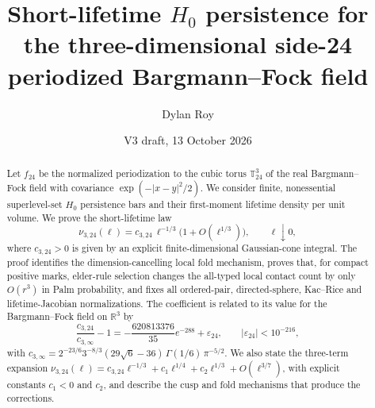 \documentclass[11pt,reqno]{amsart}
\theoremstyle{definition}
\theoremstyle{remark}
\newcommand{\T}{\mathbb T}
\newcommand{\R}{\mathbb R}
\begin{document}
\title[Short-lifetime $H_0$ persistence on the side-24 torus]{Short-lifetime $H_0$ persistence for the three-dimensional side-24 periodized Bargmann--Fock field}
\author{Dylan Roy}
\date{V3 draft, 13 October 2026}

\begin{abstract}
Let $f_{24}$ be the normalized periodization to the cubic torus $\T_{24}^3$ of the real Bargmann--Fock field with covariance $\exp(-|x-y|^2/2)$. We consider finite, nonessential superlevel-set $H_0$ persistence bars and their first-moment lifetime density per unit volume. We prove the short-lifetime law
\[
\nu_{3,24}(\ell)=c_{3,24}\,\ell^{-1/3}\bigl(1+O(\ell^{1/3})\bigr),\qquad \ell\downarrow0,
\]
where $c_{3,24}>0$ is given by an explicit finite-dimensional Gaussian-cone integral. The proof identifies the dimension-cancelling local fold mechanism, proves that, for compact positive marks, elder-rule selection changes the all-typed local contact count by only $O(r^3)$ in Palm probability, and fixes all ordered-pair, directed-sphere, Kac--Rice and lifetime-Jacobian normalizations. The coefficient is related to its value for the Bargmann--Fock field on $\R^3$ by
\[
\frac{c_{3,24}}{c_{3,\infty}}-1=-\frac{620813376}{35}e^{-288}+\varepsilon_{24},\qquad |\varepsilon_{24}|<10^{-216},
\]
with $c_{3,\infty}=2^{-23/6}3^{-8/3}(29\sqrt6-36)\,\Gamma(1/6)\,\pi^{-5/2}$.
We also state the three-term expansion $\nu_{3,24}(\ell)=c_{3,24}\ell^{-1/3}+c_1\ell^{1/4}+c_2\ell^{1/3}+O(\ell^{3/7})$, with explicit constants $c_1<0$ and $c_2$, and describe the cusp and fold mechanisms that produce the corrections.
\end{abstract}

\maketitle










\appendix




\end{document}
